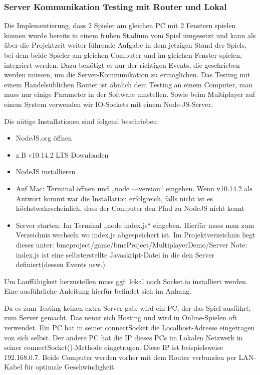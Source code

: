 \subsubsection{Server Kommunikation Testing mit Router und Lokal}
Die Implementierung, dass 2 Spieler am gleichen PC mit 2 Fenstern spielen können wurde bereits in einem frühen Stadium vom Spiel umgesetzt und kann als über die Projektzeit weiter führende Aufgabe in dem jetzigen Stand des Spiels, bei dem beide Spieler am gleichen Computer und im gleichen Fenster spielen, integriert werden. Dazu benötigt es nur der richtigen Events, die geschrieben werden müssen, um die Server-Kommunikation zu ermöglichen.
Das Testing mit einem Handelsüblichen Router ist ähnlich dem Testing an einem Computer, man muss nur einige Parameter in der Software umstellen.
Sowie beim Multiplayer auf einem System verwenden wir IO-Sockets mit einem Node-JS-Server.

Die nötige Installationen sind folgend beschrieben:
\begin{itemize}
\item NodeJS.org öffnen
\item z.B v10.14.2 LTS Downloaden
\item NodeJS installieren
\item Auf Mac: Terminal öffnen und „node —version“ eingeben. Wenn v10.14.2 als Antwort kommt
war die Installation erfolgreich, falls nicht ist es höchstwahrscheinlich, dass der Computer den
Pfad zu NodeJS nicht kennt
\item Server starten: Im Terminal „node index.js“ eingeben. Hierfür muss man zum Verzeichnis
wechseln wo index.js abgespeichert ist. Im Projektverzeichnis liegt dieses unter: bmeproject/game/bmeProject/MultiplayerDemo/Server
Note: index.js ist eine selbsterstellte Javaskript-Datei in die den Server definiert(dessen Events usw.)
\end{itemize}
Um Lauffähigkeit herzustellen muss ggf. lokal noch Socket.io installiert werden. Eine ausführliche Anleitung hierfür befindet sich im Anhang. 

Da es zum Testing keinen extra Server gab, wird ein PC, der das Spiel ausführt, zum Server gemacht. Das nennt sich Hosting und wird in Online-Spielen oft verwendet. Ein PC hat in seiner connectSocket die Localhost-Adresse eingetragen von sich selbst. Der andere PC hat die IP dieses PCs im Lokalen Netzwerk in seiner connectSocket()-Methode eingetragen. Diese IP ist beispielsweise 192.168.0.7. Beide Computer werden vorher mit dem Router verbunden per LAN-Kabel für optimale Geschwindigkeit.

